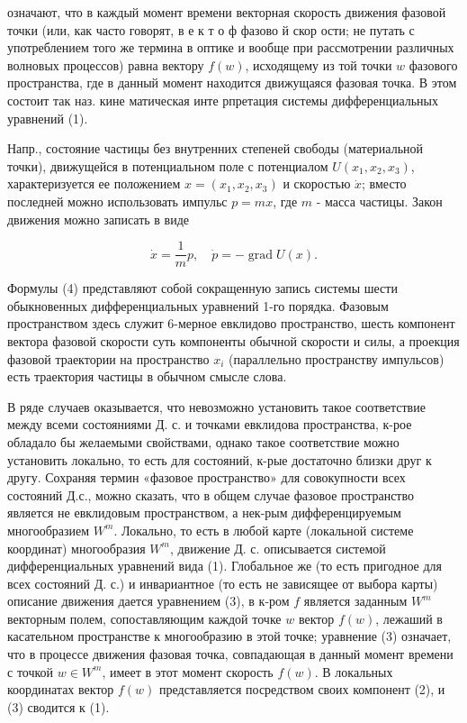 \documentclass[10pt]{article}
\begin{document}
означают, что в каждый момент времени векторная скорость движения фазовой точки (или, как часто говорят, в е к т о ф фазово й скор ости; не путать с употреблением того же термина в оптике и вообще при рассмотрении различных волновых процессов) равна вектору $f(w)$, исходящему из той точки $w$ фазового пространства, где в данный момент находится движущаяся фазовая точка. В этом состоит так наз. кине матическая инте рпретация системы дифференциальных уравнений (1).



Напр., состояние частицы без внутренних степеней свободы (материальной точки), движущейся в потенциальном поле с потенциалом $U\left(x_{1}, x_{2}, x_{3}\right)$, характеризуется ее положением $x=\left(x_{1}, x_{2}, x_{3}\right)$ и скоростью $\dot{x}$; вместо последней можно использовать импульс $p=m x$, где $m$ - масса частицы. Закон движения можно записать в виде



\[

\dot{x}=\frac{1}{m} p, \quad \dot{p}=-\operatorname{grad} U(x) .

\]



Формулы (4) представляют собой сокращенную запись системы шести обыкновенных дифференциальных уравнений 1-го порядка. Фазовым пространством здесь служит 6-мерное евклидово пространство, шесть компонент вектора фазовой скорости суть компоненты обычной скорости и силы, а проекция фазовой траектории на пространство $x_{i}$ (параллельно пространству импульсов) есть траектория частицы в обычном смысле слова.



В ряде случаев оказывается, что невозможно установить такое соответствие между всеми состояниями Д. с. и точками евклидова пространства, к-рое обладало бы желаемыми свойствами, однако такое соответствие можно установить локально, то есть для состояний, к-рые достаточно близки друг к другу. Сохраняя термин «фазовое пространство» для совокупности всех состояний Д.с., можно сказать, что в общем случае фазовое пространство является не евклидовым пространством, а нек-рым дифференцируемым многообразием $W^{m}$. Локально, то есть в любой карте (локальной системе координат) многообразия $W^{m}$, движение Д. с. описывается системой дифференциальных уравнений вида (1). Глобальное же (то есть пригодное для всех состояний Д. с.) и инвариантное (то есть не зависящее от выбора карты) описание движения дается уравнением (3), в к-ром $f$ является заданным $W^{m}$ векторным полем, сопоставляющим каждой точке $w$ вектор $f(w)$, лежаший в касательном пространстве к многообразию в этой точке; уравнение (3) означает, что в процессе движения фазовая точка, совпадающая в данный момент времени с точкой $w \in W^{m}$, имеет в этот момент скорость $f(w)$. В локальных координатах вектор $f(w)$ представляется посредством своих компонент (2), и (3) сводится к (1).
\end{document}
